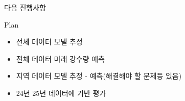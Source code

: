 \documentclass{beamer}
\begin{document}
\begin{frame}{다음 진행사항}
    \begin{block}{Plan}
        \begin{itemize}
            \item 전체 데이터 모델 추정
            \item 전체 데이터 미래 강수량 예측
            \item 지역 데이터 모델 추정 - 예측(해결해야 할 문제등 있음)
            \item 24년 25년 데이터에 기반 평가
        \end{itemize}
        
    \end{block}
\end{frame}


\end{document}
